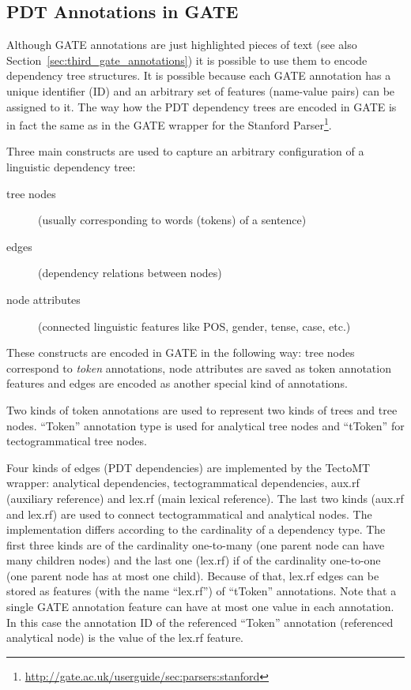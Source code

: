 \subsection{PDT Annotations in GATE} \label{sec:learning_pdt_in_gate} \label{sec:LDR_in_GATE}

Although GATE annotations are just highlighted pieces of text (see also Section~\ref{sec:third_gate_annotations}) it is possible to use them to encode dependency tree structures. It is possible because each GATE annotation has a unique identifier (ID) and an arbitrary set of features (name-value pairs) can be assigned to it. The way how the PDT dependency trees are encoded in GATE is in fact the same as in the GATE wrapper for the Stanford Parser\footnote{\url{http://gate.ac.uk/userguide/sec:parsers:stanford}}. 

Three main constructs are used to capture an arbitrary configuration of a linguistic dependency tree:


\begin{description}
	\item[tree nodes] (usually corresponding to words (tokens) of a sentence)
	\item[edges] (dependency relations between nodes)
	\item[node attributes] (connected linguistic features like POS, gender, tense, case, etc.)
\end{description}

These constructs are encoded in GATE in the following way: tree nodes correspond to \emph{token} annotations, node attributes are saved as token annotation features and edges are encoded as another special kind of annotations.

Two kinds of token annotations are used to represent two kinds of trees and tree nodes. ``Token'' annotation type is used for analytical tree nodes and ``tToken'' for tectogrammatical tree nodes.

Four kinds of edges (PDT dependencies) are implemented by the TectoMT wrapper: analytical dependencies, tectogrammatical dependencies, aux.rf (auxiliary reference) and lex.rf (main lexical reference). The last two kinds (aux.rf and lex.rf) are used to connect tectogrammatical and analytical nodes. The implementation differs according to the cardinality of a dependency type. The first three kinds are of the cardinality one-to-many (one parent node can have many children nodes) and the last one (lex.rf) if of the cardinality one-to-one (one parent node has at most one child). Because of that, lex.rf edges can be stored as features (with the name ``lex.rf'') of ``tToken'' annotations. Note that a single GATE annotation feature can have at most one value in each annotation. In this case the annotation ID of the referenced ``Token'' annotation (referenced analytical node) is the value of the lex.rf feature.

